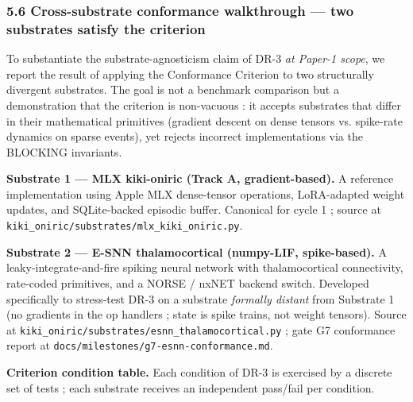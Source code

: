 \documentclass[
]{article}
\begin{document}
\subsubsection{5.6 Cross-substrate conformance walkthrough --- two
substrates satisfy the
criterion}\label{cross-substrate-conformance-walkthrough-two-substrates-satisfy-the-criterion}

To substantiate the substrate-agnosticism claim of DR-3 \emph{at Paper-1
scope}, we report the result of applying the Conformance Criterion to
two structurally divergent substrates. The goal is not a benchmark
comparison but a demonstration that the criterion is non-vacuous : it
accepts substrates that differ in their mathematical primitives
(gradient descent on dense tensors vs. spike-rate dynamics on sparse
events), yet rejects incorrect implementations via the BLOCKING
invariants.

\textbf{Substrate 1 --- MLX kiki-oniric (Track A, gradient-based).} A
reference implementation using Apple MLX dense-tensor operations,
LoRA-adapted weight updates, and SQLite-backed episodic buffer.
Canonical for cycle 1 ; source at
\texttt{kiki\_oniric/substrates/mlx\_kiki\_oniric.py}.

\textbf{Substrate 2 --- E-SNN thalamocortical (numpy-LIF, spike-based).}
A leaky-integrate-and-fire spiking neural network with thalamocortical
connectivity, rate-coded primitives, and a NORSE / nxNET backend switch.
Developed specifically to stress-test DR-3 on a substrate \emph{formally
distant} from Substrate 1 (no gradients in the op handlers ; state is
spike trains, not weight tensors). Source at
\texttt{kiki\_oniric/substrates/esnn\_thalamocortical.py} ; gate G7
conformance report at \texttt{docs/milestones/g7-esnn-conformance.md}.

\textbf{Criterion condition table.} Each condition of DR-3 is exercised
by a discrete set of tests ; each substrate receives an independent
pass/fail per condition.
\end{document}
